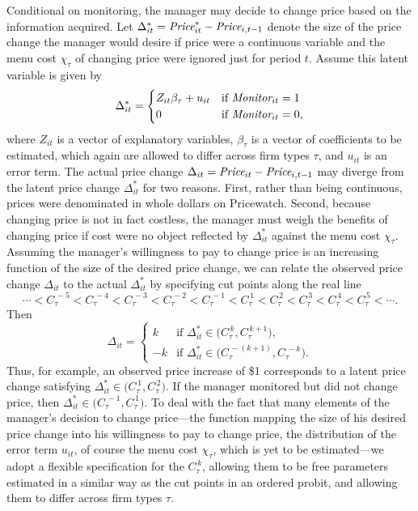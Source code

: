 \documentclass[11pt]{article}
\newcommand{\Price}{\mbox{\it Price}}
\newcommand{\Monitor}{\mbox{\it Monitor}}
\newcommand{\cut}[1]{C_{\tau}^{\,#1}}
\begin{document}
\begin{spacing}{1.3}
Conditional on monitoring, the manager may decide to change price
based on the information acquired. Let $\Delta_{it}^* = \Price_{it}^*
- \Price_{i,t-1}$ denote the size of the price change the manager
would desire if price were a continuous variable and the menu cost
$\chi_{\tau}$ of changing price were ignored just for period
$t$. Assume this latent variable is given by
\begin{equation}
\label{latentpricechange}
\Delta_{it}^* = \begin{cases}
 Z_{it} \beta_{\tau} + u_{it} & \text{if $\Monitor_{it} = 1$} \\
 0 & \text{if $\Monitor_{it} = 0$,}
\end{cases}
\end{equation}
where $Z_{it}$ is a vector of explanatory variables, $\beta_{\tau}$ is
a vector of coefficients to be estimated, which again are allowed to
differ across firm types $\tau$, and $u_{it}$ is an error term. The
actual price change $\Delta_{it} = \Price_{it} - \Price_{i,t-1}$ may
diverge from the latent price change $\Delta_{it}^*$ for two
reasons. First, rather than being continuous, prices were denominated
in whole dollars on Pricewatch. Second, because changing price is not
in fact costless, the manager must weigh the benefits of changing
price if cost were no object reflected by $\Delta_{it}^*$ against the
menu cost $\chi_{\tau}$. Assuming the manager's willingness to pay to
change price is an increasing function of the size of the desired
price change, we can relate the observed price change $\Delta_{it}$ to
the actual $\Delta_{it}^*$ by specifying cut points along the real
line
\begin{equation}
\label{C}
\cdots < \cut{-5} < \cut{-4} < \cut{-3} < \cut{-2} < \cut{-1} <
\cut{1} < \cut{2} < \cut{3} < \cut{4} < \cut{5} < \cdots .
\end{equation}
Then
\begin{equation}
\label{pricechange}
\Delta_{it} = \begin{cases} 
k & \text{if $\Delta_{it}^* \in \bigl( \cut{k}, \cut{k+1} \bigr)$,} \\[1ex] 
-k & \text{if $\Delta_{it}^*  \in \bigl( \cut{-(k+1)}, \cut{-k} \bigr)$.}
\end{cases}
\end{equation}
Thus, for example, an observed price increase of \$1 corresponds to a
latent price change satisfying $\Delta_{it}^* \in \bigl( \cut{1},
\cut{2} \bigr)$. If the manager monitored but did not change price,
then $\Delta_{it}^* \in \bigl( \cut{-1}, \cut{1} \bigr)$. To deal with
the fact that many elements of the manager's decision to change
price---the function mapping the size of his desired price change into
his willingness to pay to change price, the distribution of the error
term $u_{it}$, of course the menu cost $\chi_{\tau}$, which is yet to
be estimated---we adopt a flexible specification for the $\cut{k}$,
allowing them to be free parameters estimated in a similar way as the
cut points in an ordered probit, and allowing them to differ across
firm types $\tau$.


\end{spacing}
\end{document}
